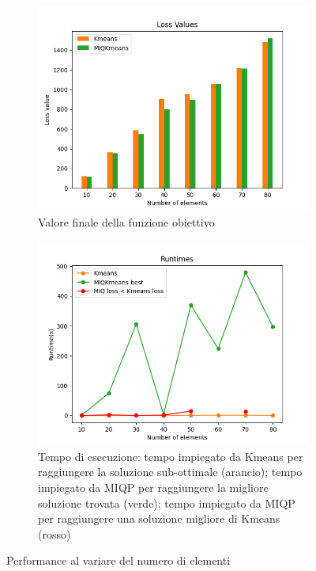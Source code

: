 \documentclass{article}
\begin{document}
    \begin{figure}[H]
     \centering
     \begin{subfigure}[t]{0.49\linewidth}
         \centering
         \includegraphics[width=\linewidth]{../results/plots/loss_size_sint}
         \caption{Valore finale della funzione obiettivo}
     \end{subfigure}
     \hfill
     \begin{subfigure}[t]{0.49\linewidth}
         \centering
         \includegraphics[width=\linewidth]{../results/plots/runtime_size_sint}
         \caption{Tempo di esecuzione: tempo impiegato da Kmeans per raggiungere la soluzione sub-ottimale (arancio); tempo impiegato da MIQP per raggiungere la migliore soluzione trovata (verde); tempo impiegato da MIQP per raggiungere una soluzione migliore di Kmeans (rosso)}
     \end{subfigure}
        \caption{Performance al variare del numero di elementi}
        \label{fig:size_sint}
     \end{figure}
\end{document}
